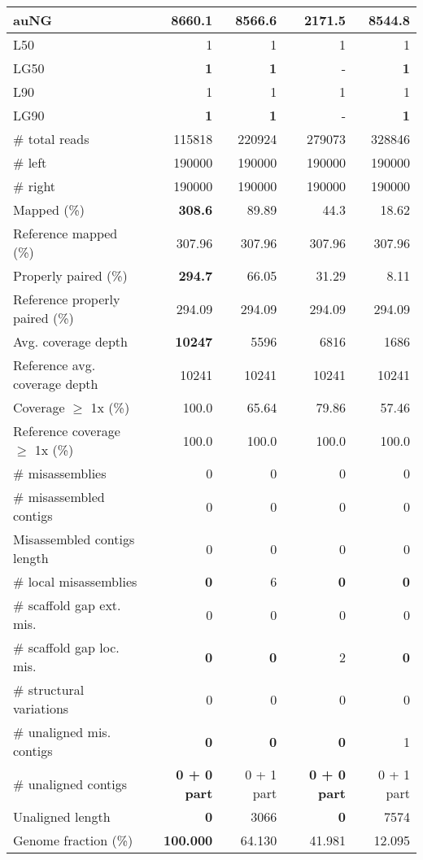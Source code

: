 \documentclass[12pt,a4paper]{article}
\begin{document}
\begin{table}[ht]
\begin{center}
\begin{tabular}{|l*{4}{|r}|}
auNG & {\bf 8660.1} & 8566.6 & 2171.5 & 8544.8 \\ \hline
L50 & 1 & 1 & 1 & 1 \\ \hline
LG50 & {\bf 1} & {\bf 1} & - & {\bf 1} \\ \hline
L90 & 1 & 1 & 1 & 1 \\ \hline
LG90 & {\bf 1} & {\bf 1} & - & {\bf 1} \\ \hline
\# total reads & 115818 & 220924 & 279073 & 328846 \\ \hline
\# left & 190000 & 190000 & 190000 & 190000 \\ \hline
\# right & 190000 & 190000 & 190000 & 190000 \\ \hline
Mapped (\%) & {\bf 308.6} & 89.89 & 44.3 & 18.62 \\ \hline
Reference mapped (\%) & 307.96 & 307.96 & 307.96 & 307.96 \\ \hline
Properly paired (\%) & {\bf 294.7} & 66.05 & 31.29 & 8.11 \\ \hline
Reference properly paired (\%) & 294.09 & 294.09 & 294.09 & 294.09 \\ \hline
Avg. coverage depth & {\bf 10247} & 5596 & 6816 & 1686 \\ \hline
Reference avg. coverage depth & 10241 & 10241 & 10241 & 10241 \\ \hline
Coverage $\geq$ 1x (\%) & 100.0 & 65.64 & 79.86 & 57.46 \\ \hline
Reference coverage $\geq$ 1x (\%) & 100.0 & 100.0 & 100.0 & 100.0 \\ \hline
\# misassemblies & 0 & 0 & 0 & 0 \\ \hline
\# misassembled contigs & 0 & 0 & 0 & 0 \\ \hline
Misassembled contigs length & 0 & 0 & 0 & 0 \\ \hline
\# local misassemblies & {\bf 0} & 6 & {\bf 0} & {\bf 0} \\ \hline
\# scaffold gap ext. mis. & 0 & 0 & 0 & 0 \\ \hline
\# scaffold gap loc. mis. & {\bf 0} & {\bf 0} & 2 & {\bf 0} \\ \hline
\# structural variations & 0 & 0 & 0 & 0 \\ \hline
\# unaligned mis. contigs & {\bf 0} & {\bf 0} & {\bf 0} & 1 \\ \hline
\# unaligned contigs & {\bf 0 + 0 part} & 0 + 1 part & {\bf 0 + 0 part} & 0 + 1 part \\ \hline
Unaligned length & {\bf 0} & 3066 & {\bf 0} & 7574 \\ \hline
Genome fraction (\%) & {\bf 100.000} & 64.130 & 41.981 & 12.095 \\ \hline

\end{tabular}
\end{center}
\end{table}
\end{document}

